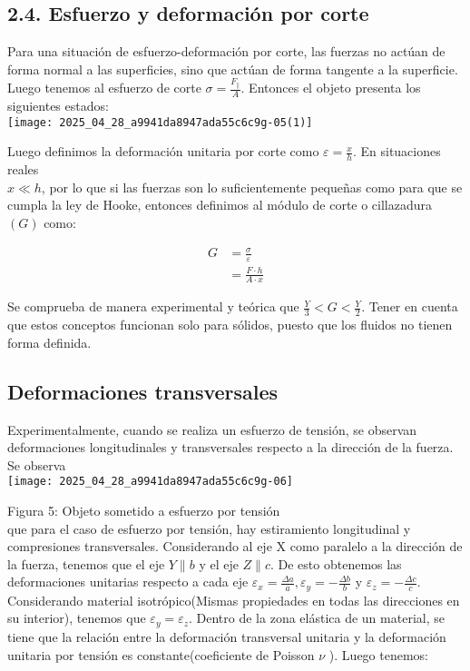 \subsection{2.4. Esfuerzo y deformación por corte}
Para una situación de esfuerzo-deformación por corte, las fuerzas no actúan de forma normal a las superficies, sino que actúan de forma tangente a la superficie. Luego tenemos al esfuerzo de corte $\sigma=\frac{F_{\|}}{A}$. Entonces el objeto presenta los siguientes estados:\\
\texttt{[image: 2025\_04\_28\_a9941da8947ada55c6c9g-05(1)]}

Luego definimos la deformación unitaria por corte como $\varepsilon=\frac{x}{h}$. En situaciones reales\\
$x \ll h$, por lo que si las fuerzas son lo suficientemente pequeñas como para que se cumpla la ley de Hooke, entonces definimos al módulo de corte o cillazadura $(G)$ como:

$$
\begin{aligned}
G & =\frac{\sigma}{\varepsilon} \\
& =\frac{F \cdot h}{A \cdot x}
\end{aligned}
$$

Se comprueba de manera experimental y teórica que $\frac{Y}{3}<G<\frac{Y}{2}$. Tener en cuenta que estos conceptos funcionan solo para sólidos, puesto que los fluidos no tienen forma definida.

\subsection{ Deformaciones transversales}
Experimentalmente, cuando se realiza un esfuerzo de tensión, se observan deformaciones longitudinales y transversales respecto a la dirección de la fuerza. Se observa\\
\texttt{[image: 2025\_04\_28\_a9941da8947ada55c6c9g-06]}

Figura 5: Objeto sometido a esfuerzo por tensión\\
que para el caso de esfuerzo por tensión, hay estiramiento longitudinal y compresiones transversales. Considerando al eje X como paralelo a la dirección de la fuerza, tenemos que el eje $Y \| b$ y el eje $Z \| c$. De esto obtenemos las deformaciones unitarias respecto a cada eje $\varepsilon_{x}=\frac{\Delta a}{a}, \varepsilon_{y}=-\frac{\Delta b}{b}$ y $\varepsilon_{z}=-\frac{\Delta c}{c}$. Considerando material isotrópico(Mismas propiedades en todas las direcciones en su interior), tenemos que $\varepsilon_{y}=\varepsilon_{z}$. Dentro de la zona elástica de un material, se tiene que la relación entre la deformación transversal unitaria y la deformación unitaria por tensión es constante(coeficiente de Poisson $\nu$ ). Luego tenemos:


